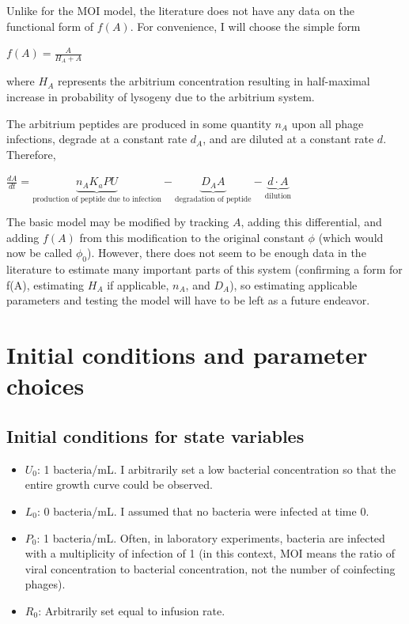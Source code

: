 \documentclass{article}
\begin{document}
Unlike for the MOI model, the literature does not have any data on the functional form of $f(A)$. For convenience, I will choose the simple form 

\begin{center}
$f(A) = \frac{A}{H_A+A}$
\end{center}

where $H_A$ represents the arbitrium concentration resulting in half-maximal increase in probability of lysogeny due to the arbitrium system.

The arbitrium peptides are produced in some quantity $n_A$ upon all phage infections, degrade at a constant rate $d_A$, and are diluted at a constant rate $d$. Therefore, 
\begin{center}
$\frac{dA}{dt} = \underbrace{n_AK_aPU}_{\text{production of peptide due to infection}}-\underbrace{D_AA}_{\text{degradation of peptide}}-\underbrace{d \cdot A}_{\text{dilution}}$
\end{center}

The basic model may be modified by tracking $A$, adding this differential, and adding $f(A)$ from this modification to the original constant $\phi$ (which would now be called $\phi_0$). However, there does not seem to be enough data in the literature to estimate many important parts of this system (confirming a form for f(A), estimating $H_A$ if applicable, $n_A$, and $D_A$), so estimating applicable parameters and testing the model will have to be left as a future endeavor. 

\section{Initial conditions and parameter choices}

\subsection{Initial conditions for state variables}
\begin{itemize}
\item $U_0$: 1 bacteria/mL. I arbitrarily set a low bacterial concentration so that the entire growth curve could be observed.
\item $L_0$: 0 bacteria/mL. I assumed that no bacteria were infected at time 0.
\item $P_0$: 1 bacteria/mL. Often, in laboratory experiments, bacteria are infected with a multiplicity of infection of 1 (in this context, MOI means the ratio of viral concentration to bacterial concentration, not the number of coinfecting phages). 
\item $R_0$: Arbitrarily set equal to infusion rate. 
\end{itemize}
\end{document}
